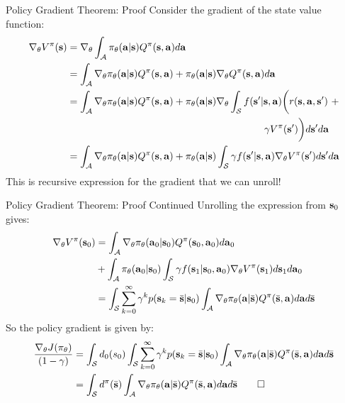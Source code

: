 \documentclass[]{beamer}
\begin{document}
\begin{frame}{Policy Gradient Theorem: Proof}
    Consider the gradient of the state value function:
    {\small \begin{align*}
        \nabla_\theta V^\pi(\vs) &= \nabla_\theta \int_\cA \pi_\theta(\va | \vs) Q^\pi(\vs, \va) d\va \\
        &= \int_\cA \nabla_\theta \pi_\theta(\va | \vs) Q^\pi(\vs, \va) + \pi_\theta(\va | \vs) \nabla_\theta Q^\pi(\vs, \va) d\va \\
        &= \int_\cA \nabla_\theta \pi_\theta(\va | \vs) Q^\pi(\vs, \va) + \pi_\theta(\va | \vs) \nabla_\theta \int_\cS f(\vs' | \vs, \va) \bigg(r(\vs, \va, \vs') \ + \\
        & \hspace{7cm} \gamma V^\pi(\vs') \bigg) d\vs' d\va \\
        &= \int_\cA \nabla_\theta \pi_\theta(\va | \vs) Q^\pi(\vs, \va) + \pi_\theta(\va | \vs) \int_\cS \gamma f(\vs' | \vs, \va) \nabla_\theta V^\pi(\vs') d\vs' d\va \\
    \end{align*} }
    This is recursive expression for the gradient that we can unroll!

\end{frame}

\begin{frame}{Policy Gradient Theorem: Proof Continued}
    Unrolling the expression from $\vs_0$ gives:
    {\small \begin{align*}
        \nabla_\theta V^\pi(\vs_0) &= \int_\cA \nabla_\theta \pi_\theta(\va_0 | \vs_0) Q^\pi(\vs_0, \va_0) d \va_0 \\
        & + \int_\cA \pi_\theta(\va_0 | \vs_0) \int_\cS \gamma f(\vs_1 | \vs_0, \va_0) \nabla_\theta V^\pi(\vs_1) d\vs_1 d\va_0 \\
        &= \int_\cS \sum_{k=0}^\infty \gamma^k p(\vs_k = \bar \vs | \vs_0) \int_\cA \nabla_\theta \pi_\theta(\va | \bar \vs) Q^\pi(\bar \vs, \va) d\va d\bar \vs
    \end{align*} }
    So the policy gradient is given by:
    \begin{align*}
        \frac{\nabla_\theta J(\pi_\theta)}{(1-\gamma)} &= \int_\cS d_0(s_0) \int_\cS \sum_{k=0}^\infty \gamma^k p(\vs_k = \bar \vs | \vs_0) \int_\cA \nabla_\theta \pi_\theta(\va | \bar \vs) Q^\pi(\bar \vs, \va) d\va d\bar \vs\\
        &= \int_\cS d^\pi(\bar \vs) \int_\cA \nabla_\theta \pi_\theta(\va | \bar \vs) Q^\pi(\bar \vs, \va) d\va d\bar \vs \quad \quad \Box
    \end{align*}

\end{frame}
\end{document}
